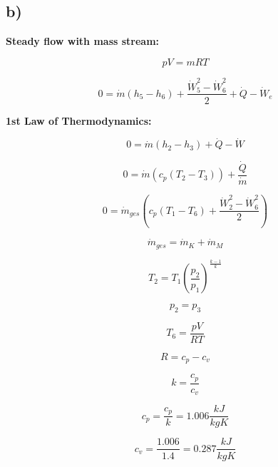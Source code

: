 

\subsection*{b)}

\textbf{Steady flow with mass stream:}

\[
pV = mRT
\]

\[
0 = \dot{m} \left( h_5 - h_6 \right) + \frac{\dot{W}_5^2 - \dot{W}_6^2}{2} + \dot{Q} - \dot{W}_e
\]

\textbf{1st Law of Thermodynamics:}

\[
0 = \dot{m} \left( h_2 - h_3 \right) + \dot{Q} - \dot{W}
\]

\[
0 = \dot{m} \left( c_p \left( T_2 - T_3 \right) \right) + \frac{\dot{Q}}{\dot{m}}
\]

\[
0 = \dot{m}_{ges} \left( c_p \left( T_1 - T_6 \right) + \frac{\dot{W}_2^2 - \dot{W}_6^2}{2} \right)
\]

\[
\dot{m}_{ges} = \dot{m}_K + \dot{m}_M
\]

\[
T_2 = T_1 \left( \frac{p_2}{p_1} \right)^{\frac{k-1}{k}}
\]

\[
p_2 = p_3
\]

\[
T_6 = \frac{pV}{RT}
\]

\[
R = c_p - c_v
\]

\[
k = \frac{c_p}{c_v}
\]

\[
c_p = \frac{c_p}{k} = 1.006 \frac{kJ}{kgK}
\]

\[
c_v = \frac{1.006}{1.4} = 0.287 \frac{kJ}{kgK}
\]
